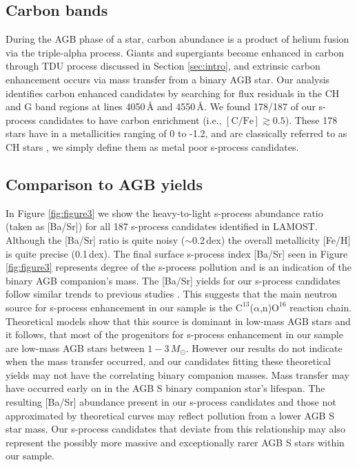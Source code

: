 \documentclass[a4paper,fleqn,usenatbib]{mnras}
\begin{document}
\subsection{Carbon bands}
During the AGB phase of a star, carbon abundance is a product of helium fusion via the triple-alpha process. Giants and supergiants become enhanced in carbon through TDU process discussed in Section \ref{sec:intro}, and extrinsic carbon enhancement occurs via mass transfer from a binary AGB star. Our analysis identifies carbon enhanced candidates by searching for flux residuals in the CH and G band regions at lines 4050\,\AA\hspace{0.5mm} and 4550\,\AA. We found 178/187 of our s-process candidates to have carbon enrichment (i.e., $[\textrm{C/Fe}] \gtrsim 0.5$). These 178 stars have in a metallicities ranging of 0 to -1.2, and are classically referred to as CH stars \citep[e.g.][]{luck1991, mcclure1997}, we simply define them as metal poor s-process candidates.

\subsection{Comparison to AGB yields}
In Figure \ref{fig:figure3} we show the heavy-to-light s-process abundance ratio (taken as [Ba/Sr]) for all 187 s-process candidates identified in LAMOST. Although the [Ba/Sr] ratio is quite noisy ($\sim$0.2\,dex) the overall metallicity [Fe/H] is quite precise (0.1\,dex). The final surface s-process index [Ba/Sr] seen in Figure \ref{fig:figure3} represents degree of the s-process pollution and is an indication of the binary AGB companion's mass. The [Ba/Sr] yields for our s-process candidates follow similar trends to previous studies \citep{fishlock2014,cristallo2015,karakas_lugaro2016}. This suggests that the main neutron source for s-process enhancement in our sample is the $\text{C}^{13}$(\textrm{$\alpha$},n)$\text{O}^{16}$ reaction chain. Theoretical models show that this source is dominant in low-mass AGB stars and it follows, that most of the progenitors for s-process enhancement in our sample are low-mass AGB stars between $1 - 3\,M_{\odot}$. However our results do not indicate when the mass transfer occurred, and our candidates fitting these theoretical yields may not have the correlating binary companion masses. Mass transfer may have occurred early on in the AGB S binary companion star's lifespan. The resulting [Ba/Sr] abundance present in our s-process candidates and those not approximated by theoretical curves may reflect pollution from a lower AGB S star mass. Our s-process candidates that deviate from this relationship may also represent the possibly more massive and exceptionally rarer AGB S stars within our sample.
\end{document}
